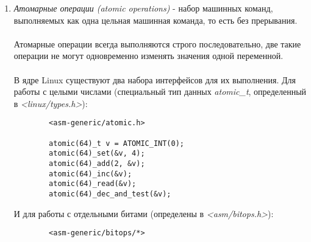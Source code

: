 \begin{enumerate}
    \item \textit{Атомарные операции (atomic operations)} - набор машинных команд, выполняемых как одна цельная машинная команда, то есть без прерывания.
    \\\\
    Атомарные операции всегда выполняются строго последовательно, две такие операции не могут одновременно изменять значения одной переменной.
    \\\\
    В ядре Linux существуют два набора интерфейсов для их выполнения. Для работы с целыми числами (специальный тип данных \textit{atomic\_t}, определенный в \textit{<linux/types.h>}):
    
    \begin{lstlisting}
        <asm-generic/atomic.h>
        
        atomic(64)_t v = ATOMIC_INT(0);
        atomic(64)_set(&v, 4);
        atomic(64)_add(2, &v);
        atomic(64)_inc(&v);
        atomic(64)_read(&v);
        atomic(64)_dec_and_test(&v);
    \end{lstlisting}
    И для работы с отдельными битами (определены в \textit{<asm/bitops.h>}):
    \begin{lstlisting}
        <asm-generic/bitops/*>
    

\end{lstlisting}
\end{enumerate}
